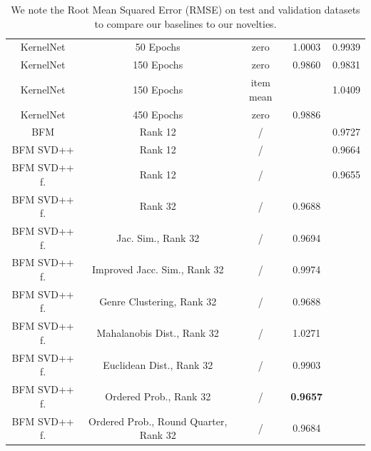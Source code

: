 \documentclass[10pt,conference,compsocconf]{IEEEtran}
\begin{document}
\begin{table}
{\begin{tabular}{|| c | c | c | c | c ||}
            \hline
            KernelNet            & 50 Epochs                             & zero                    & 1.0003                 & 0.9939                  \\
            KernelNet            & 150 Epochs                            & zero                    & 0.9860                 & 0.9831                  \\
            KernelNet            & 150 Epochs                            & item mean               &                        & 1.0409                  \\
            KernelNet            & 450 Epochs                            & zero                    & 0.9886                 &                         \\
            \hline
            BFM                  & Rank 12                               & /                       &                        & 0.9727                  \\
            BFM SVD++            & Rank 12                               & /                       &                        & 0.9664                  \\
            BFM SVD++ f.         & Rank 12                               & /                       &                        & 0.9655                  \\
            BFM SVD++ f.         & Rank 32                               & /                       & 0.9688                 &                         \\
            BFM SVD++ f.         & Jac. Sim., Rank 32                    & /                       & 0.9694                 &                         \\
            BFM SVD++ f.         & Improved Jacc. Sim., Rank 32          & /                       & 0.9974                 &                         \\
            BFM SVD++ f.         & Genre Clustering, Rank 32             & /                       & 0.9688                 &                         \\
            BFM SVD++ f.         & Mahalanobis Dist., Rank 32            & /                       & 1.0271                 &                         \\
            BFM SVD++ f.         & Euclidean Dist., Rank 32              & /                       & 0.9903                 &                         \\
            BFM SVD++ f.         & Ordered Prob., Rank 32                & /                       & \textbf{ 0.9657 }      &                         \\
            BFM SVD++ f.         & Ordered Prob., Round Quarter, Rank 32 & /                       & 0.9684                 &                         \\
            \hline
        \end{tabular}
        }
        \caption{We note the Root Mean Squared Error (RMSE) on test and validation datasets to compare our baselines to our novelties.}
        \label{tab:ablation}
    \end{table}
\end{document}
